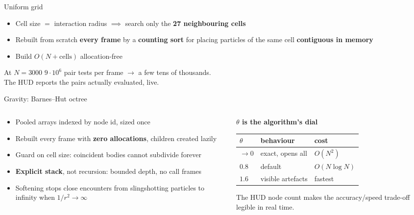 \documentclass[10pt]{beamer}
\begin{document}
\begin{frame}{Uniform grid}
	\begin{itemize}
		\item Cell size $=$ interaction radius $\implies$ search only the \textbf{27 neighbouring cells}
		\item Rebuilt from scratch \textbf{every frame} by a \textbf{counting sort} for placing particles of the same cell \textbf{contiguous in memory}
		\item Build $O(N + \text{cells})$ allocation-free
	\end{itemize}
	\vspace{2ex}
	\begin{block}{At $N = 3000$}
		\centering $9 \cdot 10^6$ pair tests per frame $\longrightarrow$ a few tens of thousands.\\
		The HUD reports the pairs actually evaluated, live.
	\end{block}
\end{frame}

\begin{frame}{Gravity: Barnes--Hut octree}
	\begin{columns}[T]
		\begin{column}{0.55\textwidth}
			\begin{itemize}\small
				\item Pooled arrays indexed by node id, sized once
				\item Rebuilt every frame with \textbf{zero allocations}, children created lazily
				\item Guard on cell size: coincident bodies cannot subdivide forever
				\item \textbf{Explicit stack}, not recursion: bounded depth, no call frames
				\item Softening stops close encounters from slingshotting particles to infinity when $1/r^2 \to \infty$
			\end{itemize}
		\end{column}
		\begin{column}{0.45\textwidth}
			\textbf{$\theta$ is the algorithm's dial}
			\vspace{1ex}
			{\small
				\begin{tabular}{@{}lll@{}}
					\toprule
					$\theta$ & behaviour         & cost         \\
					\midrule
					$\to 0$  & exact, opens all  & $O(N^2)$     \\
					$0.8$    & default           & $O(N\log N)$ \\
					$1.6$    & visible artefacts & fastest      \\
					\bottomrule
				\end{tabular}}
			\vspace{1.5ex}

			The HUD node count makes the accuracy/speed trade-off legible in real time.
		\end{column}
	\end{columns}
\end{frame}
\end{document}
